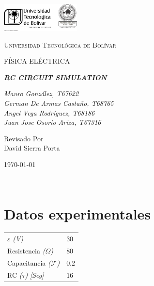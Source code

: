 \documentclass[twocolumn, 12pt]{article}
\begin{document}
\begin{titlepage}
    \centering
    \includegraphics[width=0.3\textwidth]{Images/logo_utb.png}\par\vspace{1cm}
    {\scshape\LARGE Universidad Tecnológica de Bolívar \par}
    \vspace{1.5cm}

    {\scshape\Large FÍSICA ELÉCTRICA \par}
    \vspace{.2cm}

    \vspace{2cm}
    \slshape {\Large \bfseries{} RC CIRCUIT SIMULATION\\}
    \vspace{3cm}

    \slshape {\itshape{} Mauro González, T67622 \\}
    \slshape {\itshape{} German De Armas Castaño, T68765 \\}
    \slshape {\itshape{} Angel Vega Rodriguez, T68186 \\}
    \slshape {\itshape{} Juan Jose Osorio Ariza, T67316 \\}
    \vfill

    Revisado Por \\ David Sierra Porta \\

    {\large \today\par}
\end{titlepage}

~\nocite{GoogleDrive}

\section{Datos experimentales}

\begin{table}[H]
    \captionsetup{justification=centering}
    \centering

    \begin{tabularx}{0.9\linewidth}{|>{\centering\arraybackslash}X|>{\centering\arraybackslash}X|}
        \hline
        \multicolumn{2}{|c|}{Constantes}              \\ \hline

        $\varepsilon$ \textit{(V)}            & $30$  \\\hline
        Resistencia \textit{($\Omega$)}       & $80$  \\\hline
        Capacitancia \textit{($\mathcal{F}$)} & $0.2$ \\\hline
        RC \textit{($\tau$)} \textit{[Seg]}   & $16$  \\\hline
    \end{tabularx}

\end{table}
\end{document}
